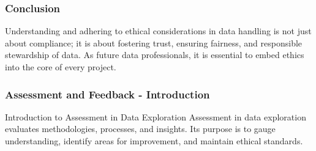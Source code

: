 \documentclass[aspectratio=169]{beamer}
\begin{document}
\begin{frame}
    \frametitle{Conclusion}
    Understanding and adhering to ethical considerations in data handling is not just about compliance; it is about fostering trust, ensuring fairness, and responsible stewardship of data. As future data professionals, it is essential to embed ethics into the core of every project.
\end{frame}

\begin{frame}[fragile]
    \frametitle{Assessment and Feedback - Introduction}
    \begin{block}{Introduction to Assessment in Data Exploration}
        Assessment in data exploration evaluates methodologies, processes, and insights. 
        Its purpose is to gauge understanding, identify areas for improvement, and maintain ethical standards.
    \end{block}
\end{frame}
\end{document}
